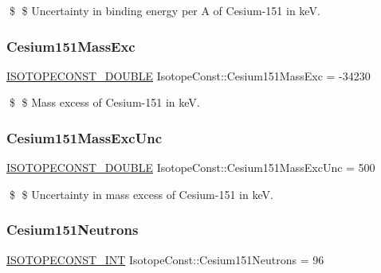 \$ \$ Uncertainty in binding energy per A of Cesium-\/151 in keV. \mbox{\label{group___isotope_const-_cesium-_cs151_ga7dd7f25ae2a9e0e563a43b4bf31e53e1}} 
\subsubsection{\texorpdfstring{Cesium151\+Mass\+Exc}{Cesium151MassExc}}
{\footnotesize\ttfamily \mbox{\hyperlink{group___isotope_const-_macros_ga8f45a7272ce02c0b4c65c44636ed719a}{I\+S\+O\+T\+O\+P\+E\+C\+O\+N\+S\+T\+\_\+\+D\+O\+U\+B\+LE}} Isotope\+Const\+::\+Cesium151\+Mass\+Exc = -\/34230}

\$ \$ Mass excess of Cesium-\/151 in keV. \mbox{\label{group___isotope_const-_cesium-_cs151_ga265539bdf167ef1dd80c8568d379ede8}} 
\subsubsection{\texorpdfstring{Cesium151\+Mass\+Exc\+Unc}{Cesium151MassExcUnc}}
{\footnotesize\ttfamily \mbox{\hyperlink{group___isotope_const-_macros_ga8f45a7272ce02c0b4c65c44636ed719a}{I\+S\+O\+T\+O\+P\+E\+C\+O\+N\+S\+T\+\_\+\+D\+O\+U\+B\+LE}} Isotope\+Const\+::\+Cesium151\+Mass\+Exc\+Unc = 500}

\$ \$ Uncertainty in mass excess of Cesium-\/151 in keV. \mbox{\label{group___isotope_const-_cesium-_cs151_ga8241d912cf5ec4cbb15ffb349d711ab2}} 
\subsubsection{\texorpdfstring{Cesium151\+Neutrons}{Cesium151Neutrons}}
{\footnotesize\ttfamily \mbox{\hyperlink{group___isotope_const-_macros_ga5f18360b3e99483a35c32d789e62621c}{I\+S\+O\+T\+O\+P\+E\+C\+O\+N\+S\+T\+\_\+\+I\+NT}} Isotope\+Const\+::\+Cesium151\+Neutrons = 96}

